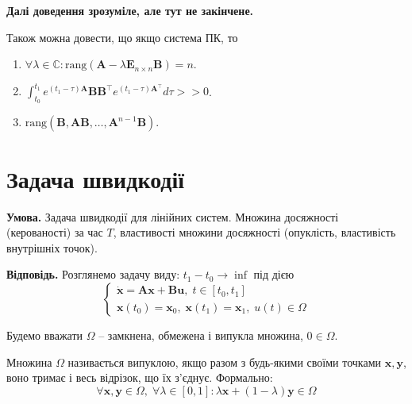 \documentclass[14pt]{extarticle}
\newcommand{\<}{\langle}
\renewcommand{\>}{\rangle}
\theoremstyle{mystyle}{\newtheorem{definition}{Definition}[section]}
\theoremstyle{mystyle}{\newtheorem{proposition}[definition]{Proposition}}
\theoremstyle{mystyle}{\newtheorem{theorem}[definition]{Theorem}}
\theoremstyle{mystyle}{\newtheorem{lemma}[definition]{Lemma}}
\theoremstyle{mystyle}{\newtheorem{corollary}[definition]{Corollary}}
\theoremstyle{mystyle}{\newtheorem*{remark}{Remark}}
\theoremstyle{mystyle}{\newtheorem*{remarks}{Remarks}}
\theoremstyle{mystyle}{\newtheorem*{example}{Example}}
\theoremstyle{mystyle}{\newtheorem*{examples}{Examples}}
\theoremstyle{definition}{\newtheorem*{exercise}{Exercise}}
\theoremstyle{cstyle}{\newtheorem*{cthm}{}}
\theoremstyle{warn}
\begin{document}
\begin{center}
    \textbf{Далі доведення зрозуміле, але тут не закінчене.}
\end{center}

\begin{theorem}
    Також можна довести, що якщо система ПК, то
    \begin{enumerate}
        \item $\forall \lambda \in \mathbb{C}: \text{rang}(\boldsymbol{A}-\lambda\boldsymbol{E}_{n\times n}\boldsymbol{B})=n$.
        \item $\int_{t_0}^{t_1}e^{(t_1-\tau)\boldsymbol{A}}\boldsymbol{B}\boldsymbol{B}^{\top}e^{(t_1-\tau)\boldsymbol{A}^{\top}}d\tau >> 0$.
        \item $\text{rang}(\boldsymbol{B},\boldsymbol{A}\boldsymbol{B},\dots,\boldsymbol{A}^{n-1}\boldsymbol{B})$.
    \end{enumerate}
\end{theorem}

\pagebreak

\section{Задача швидкодії}

\textbf{Умова.} Задача швидкодії для лінійних систем. Множина досяжності (керованості) за час $T$,
властивості множини досяжності (опуклість, властивість внутрішніх точок).

\textbf{Відповідь.} Розглянемо задачу виду: $t_1-t_0 \to \inf$ під дією
\begin{equation}
    \begin{cases}
        \dot{\mathbf{x}} = \boldsymbol{A}\mathbf{x} + \boldsymbol{B}\mathbf{u}, \; t \in [t_0,t_1] \\
        \mathbf{x}(t_0) = \mathbf{x}_0, \; \mathbf{x}(t_1) = \mathbf{x}_1, \; u(t) \in \Omega
    \end{cases}
\end{equation}

Будемо вважати $\Omega$ -- замкнена, обмежена і випукла множина, $0 \in \Omega$.

\begin{definition}
    Множина $\Omega$ називається випуклою, якщо разом з будь-якими своїми точками $\mathbf{x},\mathbf{y}$, воно 
    тримає і весь відрізок, що їх з'єднує. Формально:
    \begin{equation}
        \forall \mathbf{x},\mathbf{y} \in \Omega, \; \forall \lambda \in [0,1]: \lambda \mathbf{x} + (1-\lambda)\mathbf{y} \in \Omega
    \end{equation}
\end{definition}
\end{document}
